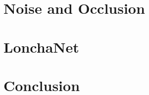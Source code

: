 \section{Noise and Occlusion}
\label{cha:objrecog:sec:study}

\section{LonchaNet}
\label{cha:objrecog:sec:lonchanet}

\section{Conclusion}
\label{cha:objrecog:sec:conclusion}
